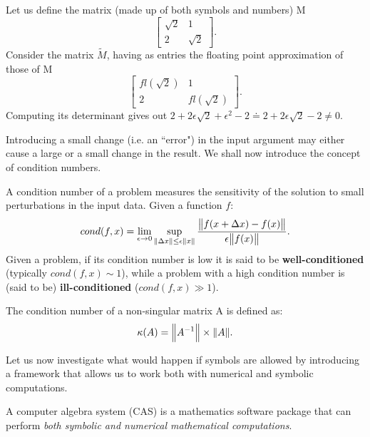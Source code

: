 \begin{example}
    Let us define the matrix (made up of both symbols and numbers) M
    \[
        \begin{bmatrix}
            \sqrt{2}  &   1    \\
                2     & \sqrt{2}
        \end{bmatrix}.
    \]
    Consider the matrix \( \tilde{M} \), having as entries the floating point approximation of those of M
    \[
        \begin{bmatrix}
            fl(\sqrt{2})      &         1      \\
                2             &    fl(\sqrt{2})
        \end{bmatrix}.
    \]
    Computing its determinant gives out \( 2  +2\epsilon\sqrt{2} + \epsilon^2 - 2 \doteq 2 + 2\epsilon\sqrt{2} -2 \neq 0 \).
\end{example}

Introducing a small change (i.e. an ``error") in the input argument may either cause a large or a small change in the result.
We shall now introduce the concept of condition numbers.

\begin{definition}
    A condition number of a problem measures the sensitivity of the solution to small perturbations in the input data.
    Given a function \(f \):
    \[
        cond(f, x) = \lim_{\epsilon \to 0} \sup \limits_{\norm{\Delta x} \leq \epsilon \norm{x}}
        \dfrac{\norm{f(x+\Delta x) - f(x)}}{\epsilon \norm{f(x)}}.
    \]
    Given a problem, if its condition number is low it is said to be \textbf{well-conditioned} (typically \( cond(f, x) \sim 1 \)),
    while a problem with a high condition number is (said to be) \textbf{ill-conditioned} (\( cond(f, x) \gg 1 \)).
\end{definition}

\begin{definition}
    The condition number of a non-singular matrix A is defined as:
    \[
        \kappa(A) = \norm{A^{-1}} \times \norm{A}.
    \]
\end{definition}

Let us now investigate what would happen if symbols are allowed by introducing a framework that allows us to work both with numerical
and symbolic computations.
\begin{definition}
    A computer algebra system (CAS) is a mathematics software package that can perform \textit{both symbolic and numerical
    mathematical computations}.
\end{definition}

